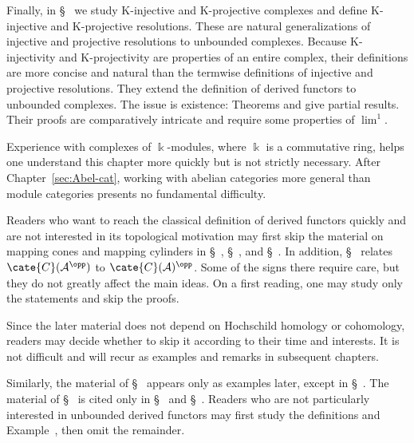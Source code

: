 Finally, in \S~ we study
K-injective and K-projective complexes and define K-injective and
K-projective resolutions. These are natural generalizations of injective and
projective resolutions to unbounded complexes. Because K-injectivity and
K-projectivity are properties of an entire complex, their definitions are
more concise and natural than the termwise definitions of injective and
projective resolutions. They extend the definition of derived functors to
unbounded complexes. The issue is existence: Theorems
 and
 give partial
results. Their proofs are comparatively intricate and require some
properties of $\lim^1$.

\begin{petunjukbacaan}
	Experience with complexes of $\Bbbk$-modules, where $\Bbbk$ is a
	commutative ring, helps one understand this chapter more quickly but is not
	strictly necessary. After Chapter~\ref{sec:Abel-cat}, working with abelian
	categories more general than module categories presents no fundamental
	difficulty.

	Readers who want to reach the classical definition of derived functors
	quickly and are not interested in its topological motivation may first skip
	the material on mapping cones and mapping cylinders in
	\S~,
	\S~, and
	\S~. In addition,
	\S~ relates
	$\cate{C}(\mathcal{A}^{\opp})$ to $\cate{C}(\mathcal{A})^{\opp}$. Some of
	the signs there require care, but they do not greatly affect the main ideas.
	On a first reading, one may study only the statements and skip the proofs.

	Since the later material does not depend on Hochschild homology or
	cohomology, readers may decide whether to skip it according to their time
	and interests. It is not difficult and will recur as examples and remarks
	in subsequent chapters.

	Similarly, the material of \S~ appears only
	as examples later, except in \S~.
	The material of \S~ is cited only
	in \S~ and
	\S~. Readers who are not particularly
	interested in unbounded derived functors may first study the definitions
	and Example~, then omit
	the remainder.
\end{petunjukbacaan}
